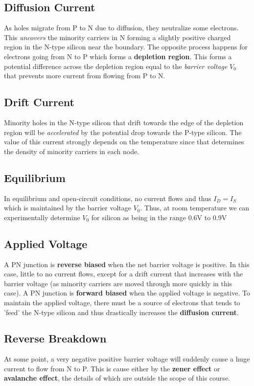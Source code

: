 \documentclass[11pt]{report}
\begin{document}
\subsection{Diffusion Current}
As holes migrate from P to N due to diffusion, they neutralize some electrons. This \textit{uncovers} the minority carriers in N forming a slightly positive charged region in the N-type silicon near the boundary. The opposite process happens for electrons going from N to P which forms a \textbf{depletion region}. This forms a potential difference across the depletion region equal to the \textit{barrier voltage} $V_0$ that prevents more current from flowing from P to N.

\subsection{Drift Current}
Minority holes in the N-type silicon that drift towards the edge of the depletion region will be \textit{accelerated} by the potential drop towards the P-type silicon. The value of this current strongly depends on the temperature since that determines the density of minority carriers in each node.

\subsection{Equilibrium}
In equilibrium and open-circuit conditions, no current flows and thus $I_D = I_S$ which is maintained by the barrier voltage $V_0$. Thus, at room temperature we can experimentally determine $V_0$ for silicon as being in the range $0.6$V to $0.9$V

\subsection{Applied Voltage}
A PN junction is \textbf{reverse biased} when the net barrier voltage is positive. In this case, little to no current flows, except for a drift current that increases with the barrier voltage (as minority carriers are moved through more quickly in this case). A PN junction is \textbf{forward biased} when the applied voltage is negative. To maintain the applied voltage, there must be a source of electrons that tends to 'feed' the N-type silicon and thus drastically increases the \textbf{diffusion current}.

\subsection{Reverse Breakdown}
 At some point, a very negative positive barrier voltage will suddenly cause a huge current to flow from N to P. This is cause either by the \textbf{zener effect} or \textbf{avalanche effect}, the details of which are outside the scope of this course.
\end{document}

